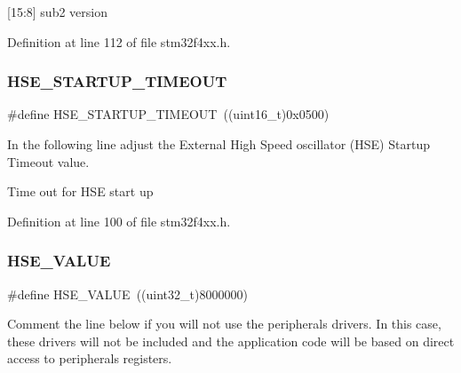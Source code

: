 \mbox{[}15\+:8\mbox{]} sub2 version 

Definition at line 112 of file stm32f4xx.\+h.

\mbox{\label{group___library__configuration__section_ga68ecbc9b0a1a40a1ec9d18d5e9747c4f}} 
\subsubsection{\texorpdfstring{H\+S\+E\+\_\+\+S\+T\+A\+R\+T\+U\+P\+\_\+\+T\+I\+M\+E\+O\+UT}{HSE\_STARTUP\_TIMEOUT}}
{\footnotesize\ttfamily \#define H\+S\+E\+\_\+\+S\+T\+A\+R\+T\+U\+P\+\_\+\+T\+I\+M\+E\+O\+UT~((uint16\+\_\+t)0x0500)}



In the following line adjust the External High Speed oscillator (H\+SE) Startup Timeout value. 

Time out for H\+SE start up 

Definition at line 100 of file stm32f4xx.\+h.

\mbox{\label{group___library__configuration__section_gaeafcff4f57440c60e64812dddd13e7cb}} 
\subsubsection{\texorpdfstring{H\+S\+E\+\_\+\+V\+A\+L\+UE}{HSE\_VALUE}}
{\footnotesize\ttfamily \#define H\+S\+E\+\_\+\+V\+A\+L\+UE~((uint32\+\_\+t)8000000)}



Comment the line below if you will not use the peripherals drivers. In this case, these drivers will not be included and the application code will be based on direct access to peripherals registers. 

